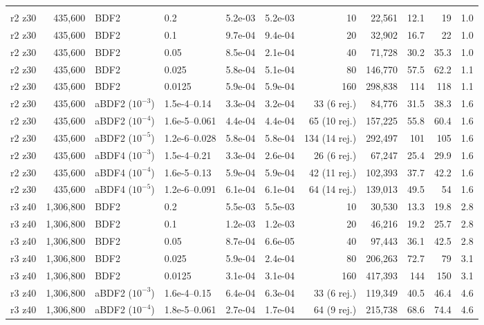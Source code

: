 \begin{longtable}{>{\footnotesize}l>{\footnotesize}r>{\footnotesize}l>{\footnotesize}l>{\footnotesize}r>{\footnotesize}r>{\footnotesize}r>{\footnotesize}r>{\footnotesize}r>{\footnotesize}r>{\footnotesize}r}
\multicolumn{11}{l}{\textbf{GARNET GH200}} \\
r2 z30 & 435,600 & BDF2 & 0.2 & 5.2e-03 & 5.2e-03 & 10 & 22,561 & 12.1 & 19 & 1.0 \\
r2 z30 & 435,600 & BDF2 & 0.1 & 9.7e-04 & 9.4e-04 & 20 & 32,902 & 16.7 & 22 & 1.0 \\
r2 z30 & 435,600 & BDF2 & 0.05 & 8.5e-04 & 2.1e-04 & 40 & 71,728 & 30.2 & 35.3 & 1.0 \\
r2 z30 & 435,600 & BDF2 & 0.025 & 5.8e-04 & 5.1e-04 & 80 & 146,770 & 57.5 & 62.2 & 1.1 \\
r2 z30 & 435,600 & BDF2 & 0.0125 & 5.9e-04 & 5.9e-04 & 160 & 298,838 & 114 & 118 & 1.1 \\
r2 z30 & 435,600 & aBDF2 ($10^{-3}$) & 1.5e-4--0.14 & 3.3e-04 & 3.2e-04 & 33 (6 rej.) & 84,776 & 31.5 & 38.3 & 1.6 \\
r2 z30 & 435,600 & aBDF2 ($10^{-4}$) & 1.6e-5--0.061 & 4.4e-04 & 4.4e-04 & 65 (10 rej.) & 157,225 & 55.8 & 60.4 & 1.6 \\
r2 z30 & 435,600 & aBDF2 ($10^{-5}$) & 1.2e-6--0.028 & 5.8e-04 & 5.8e-04 & 134 (14 rej.) & 292,497 & 101 & 105 & 1.6 \\
r2 z30 & 435,600 & aBDF4 ($10^{-3}$) & 1.5e-4--0.21 & 3.3e-04 & 2.6e-04 & 26 (6 rej.) & 67,247 & 25.4 & 29.9 & 1.6 \\
r2 z30 & 435,600 & aBDF4 ($10^{-4}$) & 1.6e-5--0.13 & 5.9e-04 & 5.9e-04 & 42 (11 rej.) & 102,393 & 37.7 & 42.2 & 1.6 \\
r2 z30 & 435,600 & aBDF4 ($10^{-5}$) & 1.2e-6--0.091 & 6.1e-04 & 6.1e-04 & 64 (14 rej.) & 139,013 & 49.5 & 54 & 1.6 \\
r3 z40 & 1,306,800 & BDF2 & 0.2 & 5.5e-03 & 5.5e-03 & 10 & 30,530 & 13.3 & 19.8 & 2.8 \\
r3 z40 & 1,306,800 & BDF2 & 0.1 & 1.2e-03 & 1.2e-03 & 20 & 46,216 & 19.2 & 25.7 & 2.8 \\
r3 z40 & 1,306,800 & BDF2 & 0.05 & 8.7e-04 & 6.6e-05 & 40 & 97,443 & 36.1 & 42.5 & 2.8 \\
r3 z40 & 1,306,800 & BDF2 & 0.025 & 5.9e-04 & 2.4e-04 & 80 & 206,263 & 72.7 & 79 & 3.1 \\
r3 z40 & 1,306,800 & BDF2 & 0.0125 & 3.1e-04 & 3.1e-04 & 160 & 417,393 & 144 & 150 & 3.1 \\
r3 z40 & 1,306,800 & aBDF2 ($10^{-3}$) & 1.6e-4--0.15 & 6.4e-04 & 6.3e-04 & 33 (6 rej.) & 119,349 & 40.5 & 46.4 & 4.6 \\
r3 z40 & 1,306,800 & aBDF2 ($10^{-4}$) & 1.8e-5--0.061 & 2.7e-04 & 1.7e-04 & 64 (9 rej.) & 215,738 & 68.6 & 74.4 & 4.6 \\

\end{longtable}
